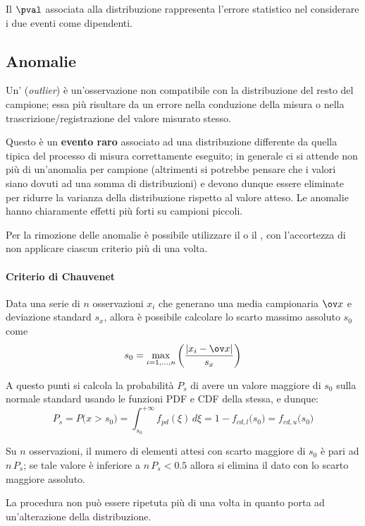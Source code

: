 		Il $\pval$ associata alla distribuzione rappresenta l'errore statistico nel considerare i due eventi come dipendenti.
		
	\subsection{Anomalie}
		Un' (\textit{outlier}) è un'osservazione non compatibile con la distribuzione del resto del campione; essa più risultare da un errore nella conduzione della misura o nella trascrizione/registrazione del valore misurato stesso.
		
		Questo è un \textbf{evento raro} associato ad una distribuzione differente da quella tipica del processo di misura correttamente eseguito; in generale ci si attende non più di un'anomalia per campione (altrimenti si potrebbe pensare che i valori siano dovuti ad una somma di distribuzioni) e devono dunque essere eliminate per ridurre la varianza della distribuzione rispetto al valore atteso. Le anomalie hanno chiaramente effetti più forti su campioni piccoli.
		
		Per la rimozione delle anomalie è possibile utilizzare il  o il , con l'accortezza di non applicare ciascun criterio più di una volta.
		
		\paragraph{Criterio di Chauvenet} Data una serie di $n$ osservazioni $x_i$ che generano una media campionaria $\ov x$ e deviazione standard $s_x$, allora è possibile calcolare lo scarto massimo assoluto $s_0$ come
		\[ s_0 = \max_{i=1,\dots, n} \left(\frac{|x_i - \ov x|}{s_x}\right)  \] 
		
		A questo punti si calcola la probabilità $P_s$ di avere un valore maggiore di $s_0$ sulla normale standard usando le funzioni PDF e CDF della stessa, e dunque:
		\[P_s =P\big(x>s_0\big) = \int_{s_0}^{+\infty} f_{pd}(\xi)\, d\xi = 1 - f_{cd,l}\big(s_0\big) = f_{cd,u}\big(s_0\big)  \]
		
		Su $n$ osservazioni, il numero di elementi attesi con scarto maggiore di $s_0$ è pari ad $n\, P_s$; se tale valore è inferiore a $n\, P_s < 0.5$ allora si elimina il dato con lo scarto maggiore assoluto.
		\begin{nota}
			La procedura non può essere ripetuta più di una volta in quanto porta ad un'alterazione della distribuzione.
		\end{nota}
	
